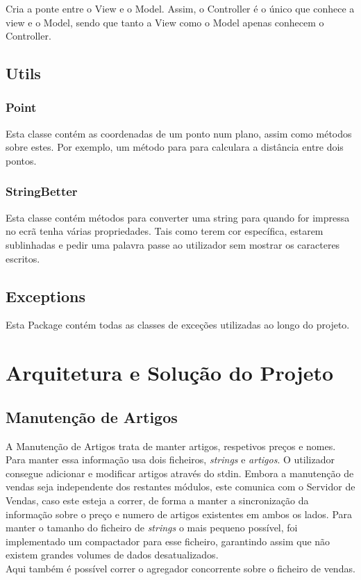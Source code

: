 \documentclass[a4paper]{report}
\begin{document}
Cria a ponte entre o View e o Model. Assim, o Controller é o único que conhece a view e o
Model, sendo que tanto a View como o Model apenas conhecem o Controller.

\section{Utils}

\subsection{Point}

Esta classe contém as coordenadas de um ponto num plano, assim como métodos sobre estes.
Por exemplo, um método para para calculara a distância entre dois pontos.

\subsection{StringBetter}

Esta classe contém métodos para converter uma string para quando for
impressa no ecrã tenha várias propriedades. Tais como terem cor
específica, estarem sublinhadas e pedir uma palavra passe ao utilizador sem mostrar os caracteres escritos.

\section{Exceptions}

Esta Package contém todas as classes de exceções utilizadas ao longo do projeto.

\chapter{Arquitetura e Solução do Projeto}

\section{Manutenção de Artigos}

A Manutenção de Artigos trata de manter artigos, respetivos preços
e nomes. Para manter essa informação usa dois ficheiros, \textit{strings}
e \textit{artigos}. O utilizador consegue adicionar e modificar artigos
através do stdin. Embora a manutenção de vendas seja independente dos 
restantes módulos, este comunica com o Servidor de Vendas, caso este esteja
a correr, de forma a manter a sincronização  da informação sobre o preço 
e numero de artigos existentes em ambos os lados. Para manter o tamanho
do ficheiro de \textit{strings} o mais pequeno possível, foi implementado
um compactador para esse ficheiro, garantindo assim que não existem grandes
volumes de dados desatualizados.\\
Aqui também é possível correr o agregador concorrente sobre o ficheiro 
de vendas.
\end{document}
